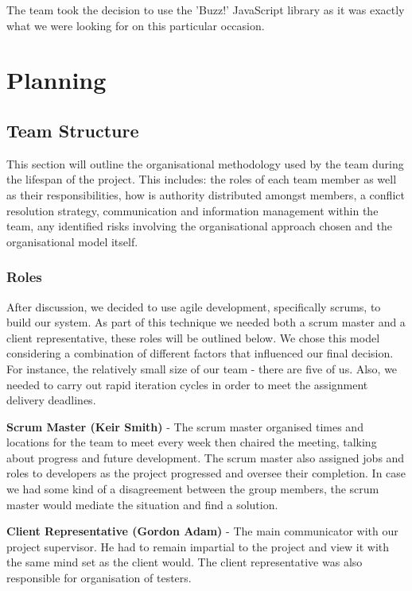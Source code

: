 \documentclass{l3proj}
\begin{document}
The team took the decision to use the 'Buzz!' JavaScript library as it was exactly what we were looking for on this particular occasion.

\chapter{Planning}
\label{Planning}

\section{Team Structure}This section will outline the organisational methodology used by the team during the lifespan of the project. This includes: the roles of each team member as well as their responsibilities, how is authority distributed amongst members, a conflict resolution strategy, communication and information management within the team, any identified risks involving the organisational approach chosen and the organisational model itself.

\subsection{Roles}After discussion, we decided to use agile development, specifically scrums, to build our system. As part of this technique we needed both a scrum master and a client representative, these roles will be outlined below. We chose this model considering a combination of different factors that influenced our final decision. For instance, the relatively small size of our team - there are five of us. Also, we needed to carry out rapid iteration cycles in order to meet the assignment delivery deadlines.

{\bf Scrum Master (Keir Smith)} - The scrum master organised times and locations for the team to meet every week then chaired the meeting, talking about progress and future development. The scrum master also assigned jobs and roles to developers as the project progressed and oversee their completion. In case we had some kind of a disagreement between the group members, the scrum master would mediate the situation and find a solution.

{\bf Client Representative (Gordon Adam)} - The main communicator with our project supervisor. He had to remain impartial to the project and view it with the same mind set as the client would. The client representative was also responsible for organisation of testers.
\end{document}
